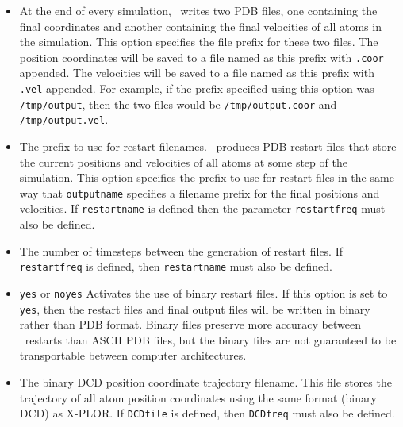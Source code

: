 \begin{itemize}
\item
{}
{\label{param:outputname}
At the end of every simulation, \NAMD\ writes two PDB files, one 
containing the final coordinates and another containing 
the final velocities of all atoms in the simulation.  
This option specifies the file prefix for these two files.  
The position coordinates will be saved to a file named as this prefix 
with \verb!.coor! appended.  
The velocities will be saved to a file 
named as this prefix with \verb!.vel! appended.  
For example, 
if the prefix specified using this option was \verb!/tmp/output!, 
then the two files 
would be \verb!/tmp/output.coor! and \verb!/tmp/output.vel!.}

\item
{}
{
The prefix to use for restart filenames.  
\NAMD\ produces PDB restart files 
that store the current positions and velocities of all 
atoms at some step of the simulation.  
This option specifies the prefix to use for restart 
files in the same way that \verb!outputname! 
specifies a filename prefix for the final
positions and velocities.  
If \verb!restartname! is defined then
the parameter \verb!restartfreq! must also be defined.}

\item
{}
{
The number of timesteps between the generation of restart files.  
If \verb!restartfreq! is defined, then \verb!restartname! 
must also be defined.}

\item
{}%
{\verb!yes! or \verb!no!}{\verb!yes!}%
{%
Activates the use of binary restart files.  
If this option is set to \verb!yes!, then the restart 
files and final output files 
will be written in binary rather than PDB format.  
Binary files preserve more accuracy between \NAMD\ restarts 
than ASCII PDB files, 
but the binary files are not guaranteed to be transportable 
between computer architectures.  
}

\item
{}
{
The binary DCD position coordinate trajectory filename.  
This file stores the trajectory of all atom position coordinates 
using the same format (binary DCD) as X-PLOR.  
If \verb!DCDfile! is defined, then \verb!DCDfreq! must also be defined.  
}


\end{itemize}
